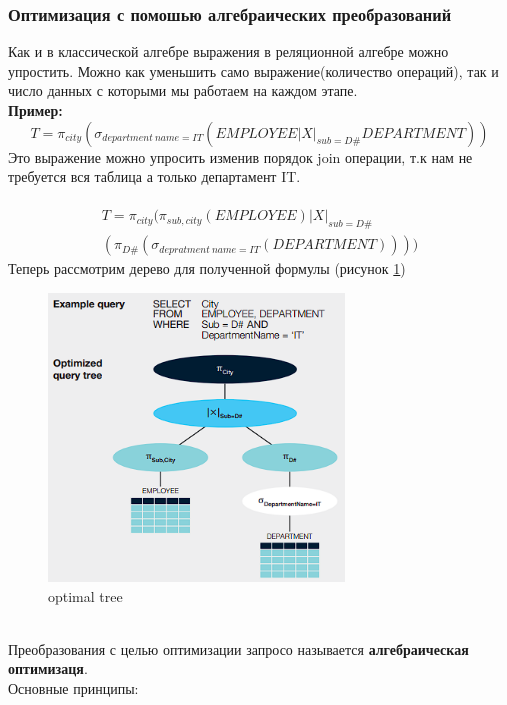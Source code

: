 \documentclass{article}
\begin{document}
\subsubsection{Оптимизация с помошью алгебраических преобразований}
Как и в классической алгебре выражения в реляционной алгебре можно упростить. Можно как уменьшить само выражение(количество операций), так и число данных с которыми мы работаем на каждом этапе.\\
\textbf{Пример:}\\
\begin{equation}
        T= \pi_{city} (\sigma_{department\:name = IT} (EMPLOYEE |X|_{sub = D\#} DEPARTMENT))
\end{equation}
Это выражение можно упросить изменив порядок join операции, т.к нам не требуется вся таблица а только департамент IT.\\\\
\begin{eqnarray}
        T= \pi_{city}(\pi_{sub,city}(EMPLOYEE)|X|_{sub = D\#} \\\nonumber(\pi_{D\#}(\sigma_{depratment\:name = IT}(DEPARTMENT))))
\end{eqnarray}
Теперь рассмотрим дерево для полученной формулы (рисунок \ref{img6})
\begin{figure}[ht]
    \centering
    \includegraphics[width=0.7\textwidth]{images/tree_optim.png}
    \caption{optimal tree}
    \label{img6}
\end{figure}\\
Преобразования с целью оптимизации запросо называется \textbf{алгебраическая оптимизаця}.\\
Основные принципы:
\end{document}
